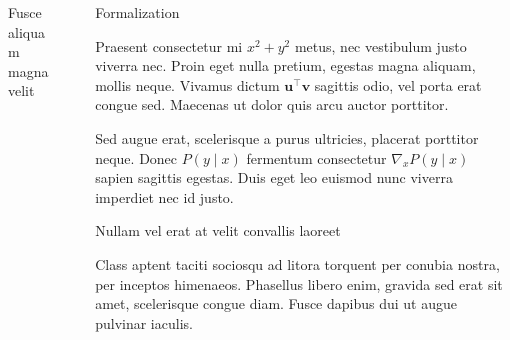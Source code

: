 \documentclass[usenames, dvipsnames, final]{beamer}
\newlength{\sepwidth}
\newlength{\colwidth}
\newcommand{\separatorcolumn}{\begin{column}{\sepwidth}\end{column}}
\begin{document}
\begin{frame}[t]
\begin{columns}[t]
\begin{column}{\colwidth}
\begin{block}{Fusce aliquam magna velit}
  \end{block}
\end{column}

\separatorcolumn

\begin{column}{\colwidth}
   \begin{block}{Formalization}


    Praesent consectetur mi $x^2 + y^2$ metus, nec vestibulum justo viverra
    nec. Proin eget nulla pretium, egestas magna aliquam, mollis neque. Vivamus
    dictum $\mathbf{u}^\intercal\mathbf{v}$ sagittis odio, vel porta erat
    congue sed. Maecenas ut dolor quis arcu auctor porttitor.


    Sed augue erat, scelerisque a purus ultricies, placerat porttitor neque.
    Donec $P(y \mid x)$ fermentum consectetur $\nabla_x P(y \mid x)$ sapien
    sagittis egestas. Duis eget leo euismod nunc viverra imperdiet nec id
    justo.

  \end{block}

  \begin{block}{Nullam vel erat at velit convallis laoreet}

    Class aptent taciti sociosqu ad litora torquent per conubia nostra, per
    inceptos himenaeos. Phasellus libero enim, gravida sed erat sit amet,
    scelerisque congue diam. Fusce dapibus dui ut augue pulvinar iaculis.


\end{block}
\end{column}
\end{columns}
\end{frame}
\end{document}
